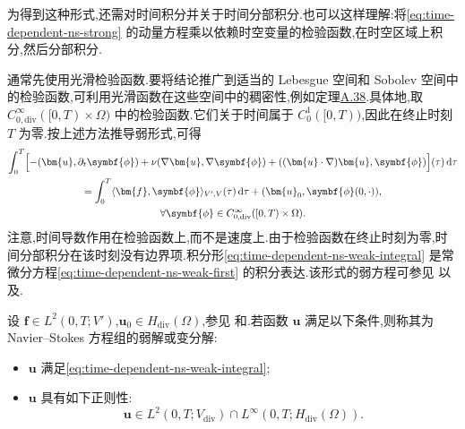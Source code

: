 \begin{note}[速度弱方程的第二种形式]\label{note:time-dependent-ns-weak-form-second}
为得到这种形式,还需对时间积分并关于时间分部积分.也可以这样理解:将\cref{eq:time-dependent-ns-strong} 的动量方程乘以依赖时空变量的检验函数,在时空区域上积分,然后分部积分.

通常先使用光滑检验函数.要将结论推广到适当的 Lebesgue 空间和 Sobolev 空间中的检验函数,可利用光滑函数在这些空间中的稠密性,例如定理\hyperref[thm:appendix-a-38]{A.38}.具体地,取
$C^\infty_{0,\mathrm{div}}([0,T)\times\Omega)$ 中的检验函数.它们关于时间属于 $C_0^1([0,T))$,因此在终止时刻 $T$ 为零.按上述方法推导弱形式,可得
\begin{equation}\label{eq:time-dependent-ns-weak-integral}
\begin{gathered}
  \int_0^T\Bigl[
    -(\bm{u},\partial_t\symbf{\phi})
    +\nu(\nabla\bm{u},\nabla\symbf{\phi})
    +((\bm{u}\cdot\nabla)\bm{u},\symbf{\phi})
  \Bigr](\tau)\,\mathrm{d}\tau\\
  =\int_0^T
       \langle\bm{f},\symbf{\phi}\rangle_{V',V}(\tau)
       \,\mathrm{d}\tau
       +(\bm{u}_0,\symbf{\phi}(0,\cdot)),\\
  \forall\symbf{\phi}\in C^\infty_{0,\mathrm{div}}
       ([0,T)\times\Omega).
\end{gathered}
\end{equation}
注意,时间导数作用在检验函数上,而不是速度上.由于检验函数在终止时刻为零,时间分部积分在该时刻没有边界项.积分形\cref{eq:time-dependent-ns-weak-integral} 是常微分方程\cref{eq:time-dependent-ns-weak-first} 的积分表达.该形式的弱方程可参见\textcite{Galdi2000,Amann2000} 以及\textcite[第 263 页]{Sohr2001}.
\end{note}

\begin{definition}\label{def:time-dependent-ns-weak-solution}
设 $\bm{f}\in L^2(0,T;V')$,$\bm{u}_0\in H_{\mathrm{div}}(\Omega)$,参见\textcite{Galdi2000} 和\textcite[第 263 页]{Sohr2001}.若函数 $\bm{u}$ 满足以下条件,则称其为 Navier--Stokes 方程组的弱解或变分解:
\begin{itemize}
  \item $\bm{u}$ 满足\cref{eq:time-dependent-ns-weak-integral};
  \item $\bm{u}$ 具有如下正则性:
  \begin{equation}\label{eq:time-dependent-ns-weak-regularity}
    \bm{u}\in L^2(0,T;V_{\mathrm{div}})
      \cap L^\infty(0,T;H_{\mathrm{div}}(\Omega)).
  \end{equation}
\end{itemize}
\end{definition}

